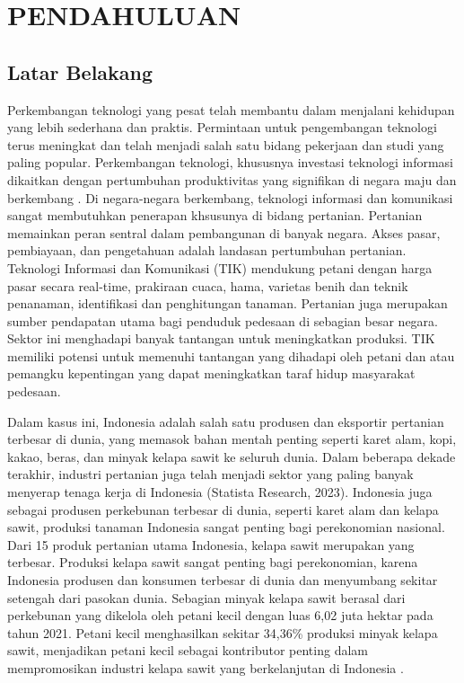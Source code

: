 \chapter{PENDAHULUAN}
\titlespacing*{\chapter}{0pt}{0pt}{0pt}
\section{Latar Belakang}
\label{sec:1-LatarBelakang}

\hspace{1,2cm}Perkembangan teknologi yang pesat telah membantu dalam menjalani kehidupan yang lebih sederhana dan praktis. Permintaan untuk pengembangan teknologi terus meningkat dan telah menjadi salah satu bidang pekerjaan dan studi yang paling popular\citep{UnderstandingTheRoleOfDigital2022}. Perkembangan teknologi, khususnya investasi teknologi informasi dikaitkan dengan pertumbuhan produktivitas yang signifikan di negara maju dan berkembang \citep{InformationTechnologyAndProductivity2014}. Di negara-negara berkembang, teknologi informasi dan komunikasi sangat membutuhkan penerapan khsusunya di bidang pertanian. Pertanian memainkan peran sentral dalam pembangunan di banyak negara. Akses pasar, pembiayaan, dan pengetahuan adalah landasan pertumbuhan pertanian. Teknologi Informasi dan Komunikasi (TIK) mendukung petani dengan harga pasar secara real-time, prakiraan cuaca, hama, varietas benih dan teknik penanaman, identifikasi dan penghitungan tanaman. Pertanian juga merupakan sumber pendapatan utama bagi penduduk pedesaan di sebagian besar negara. Sektor ini menghadapi banyak tantangan untuk meningkatkan produksi. TIK memiliki potensi untuk memenuhi tantangan yang dihadapi oleh petani dan atau pemangku kepentingan yang dapat meningkatkan taraf hidup masyarakat pedesaan\citep{TheRoleandPotential2020}.

Dalam kasus ini, Indonesia adalah salah satu produsen dan eksportir pertanian terbesar di dunia, yang memasok bahan mentah penting seperti karet alam, kopi, kakao, beras, dan minyak kelapa sawit ke seluruh dunia. Dalam beberapa dekade terakhir, industri pertanian juga telah menjadi sektor yang paling banyak menyerap tenaga kerja di Indonesia (Statista Research, 2023). Indonesia juga sebagai produsen perkebunan terbesar di dunia, seperti karet alam dan kelapa sawit, produksi tanaman Indonesia sangat penting bagi perekonomian nasional. Dari 15 produk pertanian utama Indonesia, kelapa sawit merupakan yang terbesar. Produksi kelapa sawit sangat penting bagi perekonomian, karena Indonesia produsen dan konsumen terbesar di dunia dan menyumbang sekitar setengah dari pasokan dunia. Sebagian minyak kelapa sawit berasal dari perkebunan yang dikelola oleh petani kecil dengan luas 6,02 juta hektar pada tahun 2021. Petani kecil menghasilkan sekitar 34,36\% produksi minyak kelapa sawit, menjadikan petani kecil sebagai kontributor penting dalam mempromosikan industri kelapa sawit yang berkelanjutan di Indonesia \citep{DItjenbun-2022-Statistik-Perkebunan-Unggulan}.

